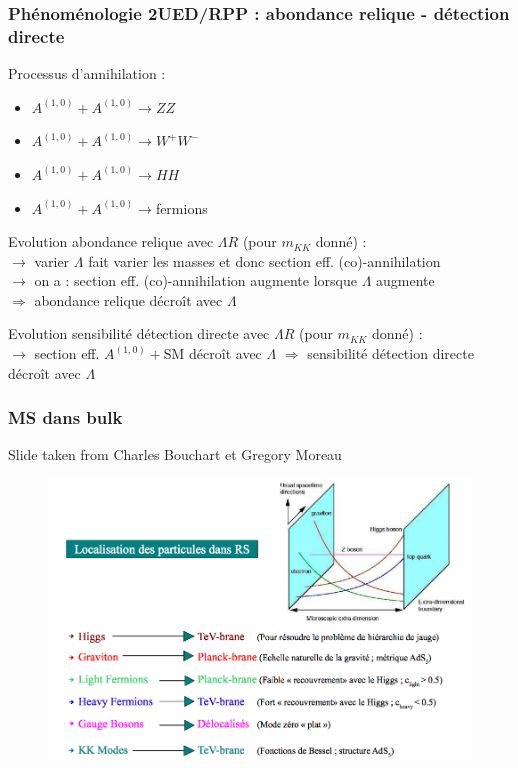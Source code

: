 \begin{frame}[plain]
\frametitle{Phénoménologie 2UED/RPP : abondance relique - détection directe}
\begin{maliste}
\item Processus d'annihilation :
\begin{itemize}
\item $A^{(1,0)}+A^{(1,0)}\rightarrow ZZ$ 
\item $A^{(1,0)}+A^{(1,0)}\rightarrow W^+W^-$ 
\item $A^{(1,0)}+A^{(1,0)}\rightarrow HH$ 
\item $A^{(1,0)}+A^{(1,0)}\rightarrow $fermions 
\end{itemize}
\vspace*{0.2cm}
\item Evolution abondance relique avec $\Lambda R$ (pour $m_{KK}$ donné) :\\
$\rightarrow$ varier $\Lambda$ fait varier les masses et donc section eff. (co)-annihilation\\
$\rightarrow$ on a : section eff. (co)-annihilation augmente lorsque $\Lambda$ augmente\\
$\Rightarrow$ abondance relique décroît avec $\Lambda$
\vspace*{0.2cm}
\item Evolution sensibilité détection directe avec $\Lambda R$ (pour $m_{KK}$ donné) :\\
$\rightarrow$ section eff. $A^{(1,0)}+\text{SM}$ décroît avec $\Lambda$
$\Rightarrow$ sensibilité détection directe décroît avec $\Lambda$
\end{maliste}
\end{frame}



\begin{frame}[plain]
\frametitle{MS dans bulk}
Slide taken from Charles Bouchart et Gregory Moreau
\begin{figure}[!htb]
\begin{center}
\hspace*{-1cm}
\includegraphics[width=1.05\textwidth]{Figures/FourTops/SMdansBulkProfiles.png}
\end{center}
\end{figure}
\end{frame}

